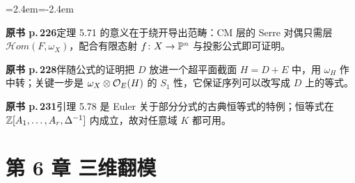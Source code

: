 \begin{list}{}{\leftmargin=2.4em\itemindent=-2.4em\itemsep=2pt\parsep=0pt}
\item \textbf{原书 p.\,226}\quad 定理 5.71 的意义在于绕开导出范畴：CM 层的 Serre 对偶只需层 $\mathcal{H}om(F,\omega_X)$，配合有限态射 $f\colon X\to\mathbb{P}^n$ 与投影公式即可证明。
\item \textbf{原书 p.\,228}\quad 伴随公式的证明把 $D$ 放进一个超平面截面 $H=D+E$ 中，用 $\omega_H$ 作中转；关键一步是 $\omega_X\otimes\mathcal{O}_E(H)$ 的 $S_1$ 性，它保证序列可以改写成 $D$ 上的等式。
\item \textbf{原书 p.\,231}\quad 引理 5.78 是 Euler 关于部分分式的古典恒等式的特例；恒等式在 $\mathbb{Z}[A_1,\dots,A_r,\Delta^{-1}]$ 内成立，故对任意域 $K$ 都可用。
\end{list}

\section*{第 6 章 三维翻模}

